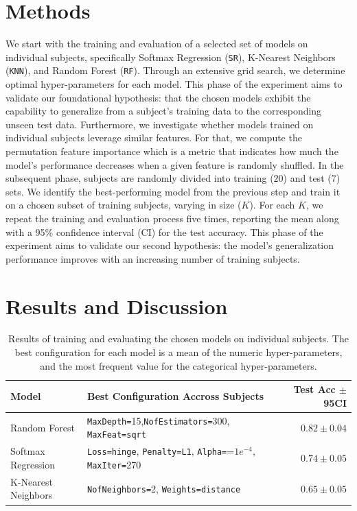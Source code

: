 \documentclass[10pt]{article}
\begin{document}
\section{Methods}
We start with the training and evaluation of a selected set of models on individual subjects, 
specifically Softmax Regression (\texttt{SR}), K-Nearest Neighbors (\texttt{KNN}), and Random Forest (\texttt{RF}). 
Through an extensive grid search, we determine optimal hyper-parameters for each model. 
This phase of the experiment aims to validate our foundational hypothesis: that the chosen models exhibit the capability to generalize 
from a subject's training data to the corresponding unseen test data. 
Furthermore, we investigate whether models trained on individual subjects leverage similar features. For that, we compute the permutation
feature importance which is a metric that indicates how much the model's performance decreases when a given feature is randomly shuffled. 
In the subsequent phase, subjects are randomly divided into training ($20$) and test ($7$) sets. 
We identify the best-performing model from the previous step and train it 
on a chosen subset of training subjects, varying in size ($K$). For each $K$, we repeat the training 
and evaluation process five times, reporting the mean along with a 95\% confidence interval (CI) 
for the test accuracy. This phase of the experiment aims to validate our second hypothesis: the model's generalization 
performance improves with an increasing number of training subjects.

\section{Results and Discussion}
\begin{table}[ht]
    \centering
    \begin{tabular}{llr}
        \toprule
        \textbf{Model} & \textbf{Best Configuration Accross Subjects} & \textbf{Test Acc $\pm$ 95CI} \\
        \midrule
        Random Forest & \texttt{MaxDepth=}15,\texttt{NofEstimators=}300, \texttt{MaxFeat=}\texttt{sqrt} & $\mathbf{0.82 \pm0.04}$ \\
        Softmax Regression & \texttt{Loss=hinge}, \texttt{Penalty=L1}, \texttt{Alpha=}=$1e^{-4}$, \texttt{MaxIter=}270 &  $0.74 \pm0.05$ \\
        K-Nearest Neighbors & \texttt{NofNeighbors=}2, \texttt{Weights=distance} &  $0.65 \pm0.05$ \\
        \bottomrule
    \end{tabular}
    \caption{Results of training and evaluating the chosen models on individual subjects. 
    The best configuration for each model is a mean of the numeric hyper-parameters, 
    and the most frequent value for the categorical hyper-parameters.}
    \label{tab:results1}
\end{table}
\end{document}
